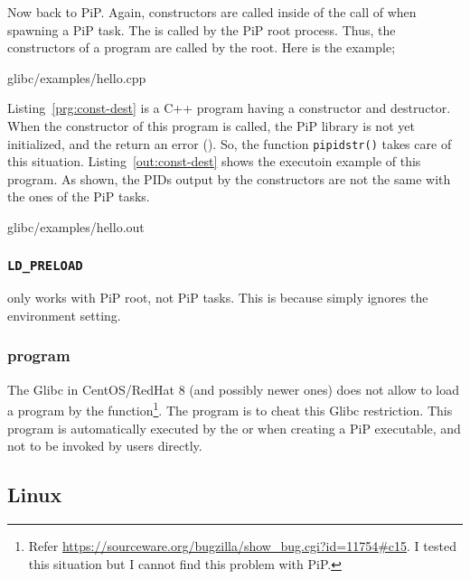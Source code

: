 Now back to PiP. Again, constructors are called inside
of the call of  when spawning a PiP task. The
 is called by the PiP root process. Thus, the
constructors of a program are called by the root. Here is the example;

 {glibc/examples/hello.cpp}

Listing~\ref{prg:const-dest} is a C++ program having a constructor and
destructor. When the constructor of this program is called, the PiP
library is not yet initialized, and the 
return an error (). So, the function {\tt pipidstr()} takes
care of this situation. Listing~\ref{out:const-dest} shows the
executoin example of this program. As shown, the PIDs output by the
constructors are not the same with the ones of the PiP tasks. 

 {glibc/examples/hello.out}

\subsubsection{{\tt LD_PRELOAD}}

 only works with PiP root, not PiP tasks. This is
because  simply ignores the 
environment setting. 

\subsubsection{ program}

The Glibc in CentOS/RedHat 8 (and possibly newer ones) does not allow
to load a program by the  function\footnote{Refer
\url{https://sourceware.org/bugzilla/show_bug.cgi?id=11754\#c15}. I
tested this situation but I cannot find this problem with PiP.}. The
 program is to cheat this Glibc restriction. This
program is automatically executed by the  or
 when creating a PiP executable, and not to be invoked
by users directly.

\subsection{Linux}

